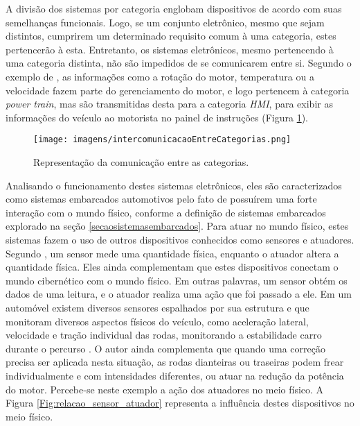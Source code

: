 A divisão dos sistemas por categoria englobam dispositivos de acordo com suas semelhanças funcionais. Logo, se um conjunto eletrônico, mesmo que sejam distintos, cumprirem um determinado requisito comum à uma categoria, estes pertencerão à esta. Entretanto, os sistemas eletrônicos, mesmo pertencendo à uma categoria distinta, não são impedidos de se comunicarem entre si. Segundo o exemplo de , as informações como a rotação do motor, temperatura ou a velocidade fazem parte do gerenciamento do motor, e logo pertencem à categoria \textit{power train}, mas são transmitidas desta para a categoria \textit{HMI}, para exibir as informações do veículo ao motorista no painel de instruções (Figura \ref{Fig:comunicacao_categorias_sistemas_embarcados}).

\begin{figure}[!ht]
\centering
\caption{Representação da comunicação entre as categorias.} 
{\texttt{[image: imagens/intercomunicacaoEntreCategorias.png]}}\\
 \label{Fig:comunicacao_categorias_sistemas_embarcados}
\end{figure}

Analisando o funcionamento destes sistemas eletrônicos, eles são caracterizados como sistemas embarcados automotivos pelo fato de possuírem uma forte interação com o mundo físico, conforme a definição de sistemas embarcados explorado na seção \ref{secaosistemasembarcados}. Para atuar no mundo físico, estes sistemas fazem o uso de outros dispositivos conhecidos como sensores e atuadores. Segundo , um sensor mede uma quantidade física, enquanto o atuador altera a quantidade física. Eles ainda complementam que estes dispositivos conectam o mundo cibernético com o mundo físico. Em outras palavras, um sensor obtém os dados de uma leitura, e o atuador realiza uma ação que foi passado a ele. Em um automóvel existem diversos sensores espalhados por sua estrutura e que monitoram diversos aspectos físicos do veículo, como aceleração lateral, velocidade e tração individual das rodas, monitorando a estabilidade carro durante o percurso \cite{navetsimonotlion}. O autor ainda complementa que quando uma correção precisa ser aplicada nesta situação, as rodas dianteiras ou traseiras podem frear individualmente e com intensidades diferentes, ou atuar na redução da potência do motor. Percebe-se neste exemplo a ação dos atuadores no meio físico. A Figura \ref{Fig:relacao_sensor_atuador} representa a influência destes dispositivos no meio físico.


